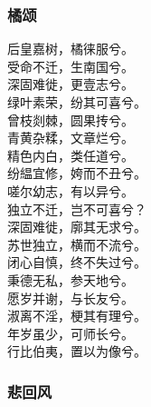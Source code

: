 \documentclass[]{article}
\begin{document}
\hypertarget{header-n115}{%
\subsubsection{橘颂}\label{header-n115}}

后皇嘉树，橘徕服兮。\\
受命不迁，生南国兮。\\
深固难徙，更壹志兮。\\
绿叶素荣，纷其可喜兮。\\
曾枝剡棘，圆果抟兮。\\
青黄杂糅，文章烂兮。\\
精色内白，类任道兮。\\
纷緼宜修，姱而不丑兮。\\
嗟尔幼志，有以异兮。\\
独立不迁，岂不可喜兮？\\
深固难徙，廓其无求兮。\\
苏世独立，横而不流兮。\\
闭心自慎，终不失过兮。\\
秉德无私，参天地兮。\\
愿岁并谢，与长友兮。\\
淑离不淫，梗其有理兮。\\
年岁虽少，可师长兮。\\
行比伯夷，置以为像兮。

\hypertarget{header-n120}{%
\subsubsection{悲回风}\label{header-n120}}
\end{document}
